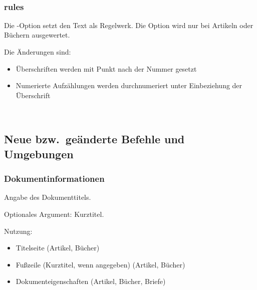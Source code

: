 \begin{nutzung}
		\>\\
\end{nutzung}

\subsubsection{rules}

Die -Option setzt den Text als Regelwerk.
Die Option wird nur bei Artikeln oder Büchern ausgewertet.

Die Änderungen sind:
\begin{itemize}
	\item Überschriften werden mit Punkt nach der Nummer gesetzt
	\item Numerierte Aufzählungen werden durchnumeriert unter Einbeziehung der Überschrift
\end{itemize}

\begin{nutzung}
		\>\\
\end{nutzung}



\subsection{Neue bzw.\ geänderte Befehle und Umgebungen}

\subsubsection{Dokumentinformationen}

\DescribeMacro{\title}
Angabe des Dokumenttitels.

Optionales Argument: Kurztitel.

Nutzung:
\begin{itemize}
	\item Titelseite (Artikel, Bücher)
	\item Fußzeile (Kurztitel, wenn angegeben) (Artikel, Bücher)
	\item Dokumenteigenschaften (Artikel, Bücher, Briefe)
\end{itemize}

\begin{nutzung}
		\>\\
	\beispiel
		\>\\
		\>
\end{nutzung}

